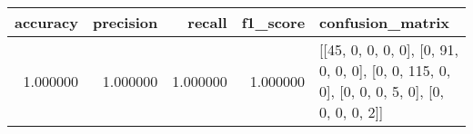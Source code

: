 \begin{tabular}{rrrrl}
\toprule
accuracy & precision & recall & f1_score & confusion_matrix \\
\midrule
1.000000 & 1.000000 & 1.000000 & 1.000000 & [[45, 0, 0, 0, 0], [0, 91, 0, 0, 0], [0, 0, 115, 0, 0], [0, 0, 0, 5, 0], [0, 0, 0, 0, 2]] \\
\bottomrule
\end{tabular}
